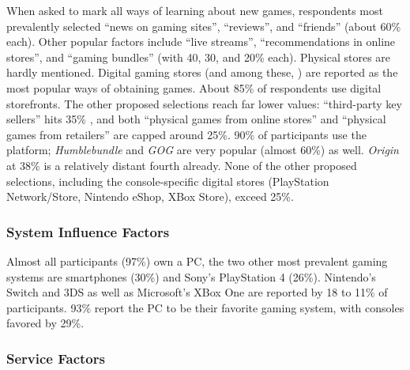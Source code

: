 When asked to mark all ways of learning about new games, respondents
most prevalently selected ``news on gaming sites'', ``reviews'', and
``friends'' (about 60\% each). Other popular factors include
``live streams'', ``recommendations in online stores'', and
``gaming bundles'' (with 40, 30, and 20\% each). Physical stores
are hardly mentioned.
Digital gaming stores (and among these, \steam) are reported as
the most popular ways of obtaining games. About 85\% of respondents
use digital storefronts. The other proposed selections reach far lower
values: ``third-party key sellers'' hits 35\% , and both ``physical
games from online stores'' and ``physical games from retailers''
are capped around 25\%.
90\% of participants use the \steam platform; \textit{Humblebundle}
and \textit{GOG} are very popular (almost 60\%) as well. \textit{Origin}
at 38\% is a relatively distant fourth already. None of the other
proposed selections, including the console-specific digital stores
(PlayStation Network/Store, Nintendo eShop, XBox Store), exceed
25\%.


\subsubsection{System Influence Factors}
Almost all participants (97\%) own a PC, the two other most prevalent
gaming systems are smartphones (30\%) and Sony's PlayStation 4 (26\%).
Nintendo's Switch and 3DS as well as Microsoft's XBox One are reported
by 18 to 11\% of participants.
93\% report the PC to be their favorite gaming system, with consoles
favored by 29\%.



\subsubsection{Service Factors}

